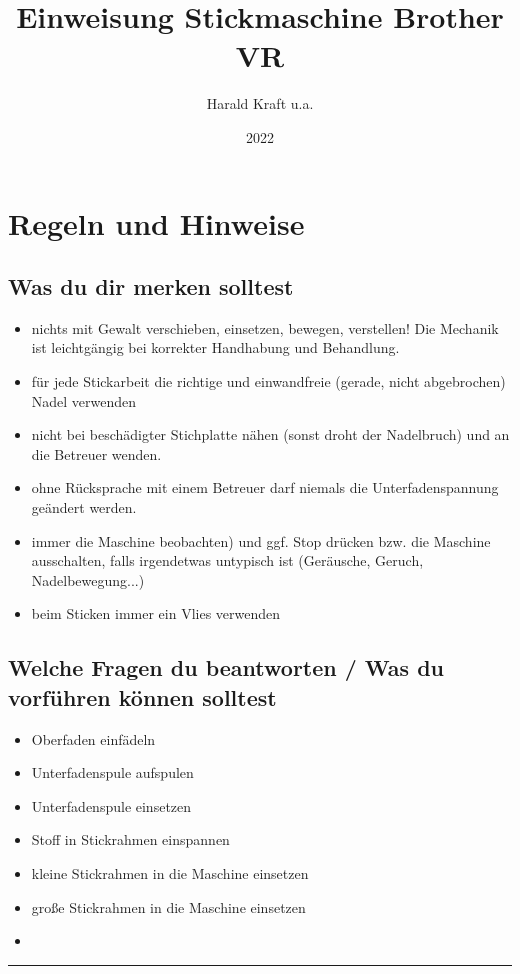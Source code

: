 \documentclass{\basedir/fablab-document}
\date{2022}
\author{Harald Kraft u.a.}
\title{Einweisung Stickmaschine Brother VR}
\renewcommand{\todo}[1]{\textbf{\color{red}{TODO: #1}}}
\begin{document}
\maketitle
\todo{Das ist aktuell noch größtenteils die Einweisung für die alte Stickmaschine. Diese Einweisung ist daher noch nicht für den Produktiveinsatz freigegeben!}

\section{Regeln und Hinweise}
\subsection{Was du dir merken solltest}
\begin{itemize}
	\item nichts mit Gewalt verschieben, einsetzen, bewegen, verstellen! Die Mechanik ist leichtgängig bei korrekter Handhabung und Behandlung.
	\item für jede Stickarbeit die richtige und einwandfreie (gerade, nicht abgebrochen) Nadel verwenden
	\item nicht bei beschädigter Stichplatte nähen (sonst droht der Nadelbruch) und an die Betreuer wenden.
	\item ohne Rücksprache mit einem Betreuer darf niemals die Unterfadenspannung geändert werden.
	\item immer die Maschine beobachten) und ggf. Stop drücken bzw. die Maschine ausschalten, falls irgendetwas untypisch ist (Geräusche, Geruch, Nadelbewegung...)
	\item beim Sticken immer ein Vlies verwenden
\end{itemize}

\subsection{Welche Fragen du beantworten / Was du vorführen können solltest}
\begin{itemize}
	\item Oberfaden einfädeln
	\item Unterfadenspule aufspulen
	\item Unterfadenspule einsetzen
	\item Stoff in Stickrahmen einspannen
	\item kleine Stickrahmen in die Maschine einsetzen
	\item große Stickrahmen in die Maschine einsetzen
	\item 
\end{itemize}
\vspace{5em}
\hrule
\end{document}
